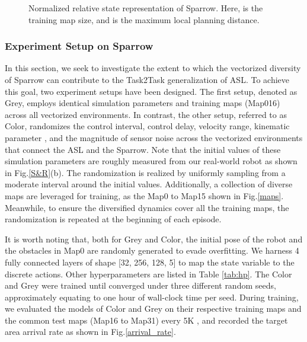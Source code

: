 \documentclass[journal]{IEEEtran}
\begin{document}
\begin{figure}[t]
	\centering
	\hfil
	\caption{Normalized relative state representation of Sparrow. Here,  is the training map size, and  is the maximum local planning distance.}
	\label{s_r}
\end{figure}

\subsubsection{Experiment Setup on Sparrow}
In this section, we seek to investigate the extent to which the vectorized diversity of Sparrow can contribute to the Task2Task generalization of ASL. To achieve this goal, two experiment setups have been designed. The first setup, denoted as Grey, employs identical simulation parameters and training maps (Map016) across all vectorized environments. In contrast, the other setup, referred to as Color, randomizes the control interval, control delay, velocity range, kinematic parameter , and the magnitude of sensor noise across the vectorized environments that connect the ASL and the Sparrow. Note that the initial values of these simulation parameters are roughly measured from our real-world robot as shown in Fig.\ref{S&R}(b). The randomization is realized by uniformly sampling from a moderate interval around the initial values. Additionally, a collection of diverse maps are leveraged for training, as the Map0 to Map15 shown in Fig.\ref{maps}. Meanwhile, to ensure the diversified dynamics cover all the training maps, the randomization is repeated at the beginning of each episode. 

It is worth noting that, both for Grey and Color, the initial pose of the robot and the obstacles in Map0 are randomly generated to evade overfitting. We harness 4 fully connected layers of shape [32, 256, 128, 5] to map the state variable to the discrete actions. Other hyperparameters are listed in Table \ref{tab:hp}. The Color and Grey were trained until converged under three different random seeds, approximately equating to one hour of wall-clock time per seed. During training, we evaluated the models of Color and Grey on their respective training maps and the common test maps (Map16 to Map31) every 5K , and recorded the target area arrival rate as shown in Fig.\ref{arrival_rate}.
\end{document}
